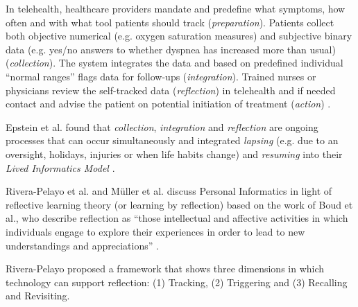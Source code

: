 In telehealth, healthcare providers mandate and predefine what symptoms, how often and with what tool patients should track (\textit{preparation}). Patients collect both objective numerical (e.g. oxygen saturation measures) and subjective binary data (e.g. yes/no answers to whether dyspnea has increased more than usual) (\textit{collection}). The system integrates the data and based on predefined individual “normal ranges” flags data for follow-ups (\textit{integration}). Trained nurses or physicians review the self-tracked data (\textit{reflection}) in telehealth and if needed contact and advise the patient on potential initiation of treatment (\textit{action}) \cite{piloting, pedone}. 

Epstein et al. found that \textit{collection}, \textit{integration} and \textit{reflection} are ongoing processes that can occur simultaneously and integrated \textit{lapsing} (e.g. due to an oversight, holidays, injuries or when life habits change) and \textit{resuming} into their \textit{Lived Informatics Model} \cite{Epstein2015, Rooksby2014}. 

Rivera-Pelayo et al.\cite{Rivera} and Müller et al.\cite{Muller} discuss Personal Informatics in light of reflective learning theory (or learning by reflection) based on the work of Boud et al., who describe reflection as “those intellectual and affective activities in which individuals engage to explore their experiences in order to lead to new understandings and appreciations” \cite{Boud}. 

Rivera-Pelayo proposed a framework that shows three dimensions in which technology can support reflection: (1) Tracking, (2) Triggering and (3) Recalling and Revisiting. 
